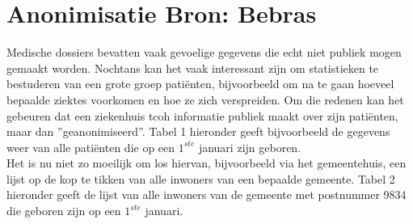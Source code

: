 \documentclass[12pt, a4paper]{article}
\begin{document}
	\begin{minipage}{\textwidth}
		\section{Anonimisatie \hfill\small Bron: Bebras}
			Medische dossiers bevatten vaak gevoelige gegevens die echt niet publiek mogen gemaakt worden. Nochtans kan het vaak interessant zijn om statistieken te bestuderen van een grote groep pati\"enten, bijvoorbeeld om na te gaan hoeveel bepaalde ziektes voorkomen en hoe ze zich verspreiden. Om die redenen kan het gebeuren dat een ziekenhuis tcoh informatie publiek maakt over zijn pati\"enten, maar dan ''geanonimiseerd''. Tabel 1 hieronder geeft bijvoorbeeld de gegevens weer van alle pati\"enten die op een $1^{ste}$ januari zijn geboren. \\
			
			Het is nu niet zo moeilijk om los hiervan, bijvoorbeeld via het gemeentehuis, een lijst op de kop te tikken van alle inwoners van een bepaalde gemeente. Tabel 2 hieronder geeft de lijst van alle inwoners van de gemeente met postnummer 9834 die geboren zijn op een $1^{ste}$ januari.
			

\end{minipage}
\end{document}
